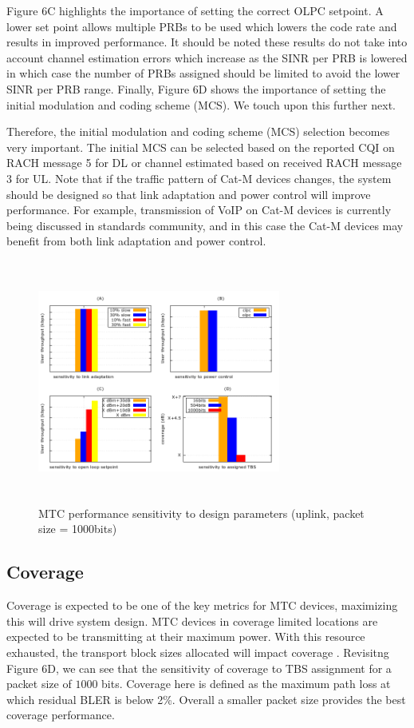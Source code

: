 \documentclass[conference,compsoc]{IEEEtran}
\begin{document}
Figure 6C highlights the importance of setting the correct OLPC setpoint. A lower set point allows multiple PRBs to be used which lowers the code rate and results in improved performance. It should be noted these results do not take into account channel estimation errors which increase as the SINR per PRB is lowered in which case the number of PRBs assigned should be limited to avoid the lower SINR per PRB range. Finally, Figure 6D shows the importance of setting the initial modulation and coding scheme (MCS). We touch upon this further next.

Therefore, the initial modulation and coding scheme (MCS) selection becomes very important. The initial MCS can be selected based on the reported CQI on RACH message 5 for DL or channel estimated based on received  RACH message 3 for UL. Note that if the traffic pattern of Cat-M devices changes, the system should be designed so that link adaptation and power control will improve performance. For example, transmission of VoIP on Cat-M devices is currently being discussed in standards community, and in this case the Cat-M devices may benefit from both link adaptation and power control.
\begin{figure}[htbp]
\centerline{\includegraphics[height=80mm,width=80mm]{sensitivity_to_design.png}}
\caption{MTC performance sensitivity to design parameters (uplink, packet size = 1000bits)}
\label{fig_sensitivity}
\end{figure}


\subsection{Coverage}
 	Coverage is expected to be one of the key metrics for MTC devices, maximizing this will drive system design. MTC devices in coverage limited locations are expected to be transmitting at their maximum power. With this resource exhausted, the transport block sizes allocated will impact  coverage . Revisitng Figure 6D, we can see that the sensitivity of coverage to TBS assignment for a packet size of  $1000$ bits.  Coverage here is defined as the maximum  path loss at which residual BLER is below 2\%. Overall a smaller packet size provides the best coverage performance.
    
\end{document}
